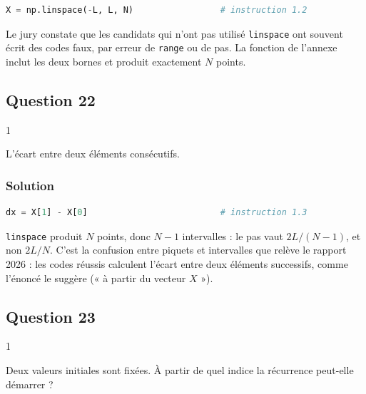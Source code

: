 \documentclass[11pt,a4paper]{article}
\begin{document}
\begin{lstlisting}[language=Python]
X = np.linspace(-L, L, N)                 # instruction 1.2
\end{lstlisting}

\begin{piege}

Le jury constate que les candidats qui n'ont pas utilisé \texttt{linspace} ont souvent écrit des codes faux, par erreur de \texttt{range} ou de pas. La fonction de l'annexe inclut les deux bornes et produit exactement \(N\) points.

\end{piege}

\hypertarget{question-22}{%
\subsection{Question 22}\label{question-22}}

\begin{indication}{1}

L'écart entre deux éléments consécutifs.

\end{indication}

\hypertarget{solution-21}{%
\subsubsection{Solution}\label{solution-21}}

\begin{lstlisting}[language=Python]
dx = X[1] - X[0]                          # instruction 1.3
\end{lstlisting}

\begin{piege}

\texttt{linspace} produit \(N\) points, donc \(N-1\) intervalles : le pas vaut \(2L/(N-1)\), et non \(2L/N\). C'est la confusion entre piquets et intervalles que relève le rapport 2026 : les codes réussis calculent l'écart entre deux éléments successifs, comme l'énoncé le suggère (« à partir du vecteur \(X\) »).

\end{piege}

\hypertarget{question-23}{%
\subsection{Question 23}\label{question-23}}

\begin{indication}{1}

Deux valeurs initiales sont fixées. À partir de quel indice la récurrence peut-elle démarrer ?

\end{indication}
\end{document}
